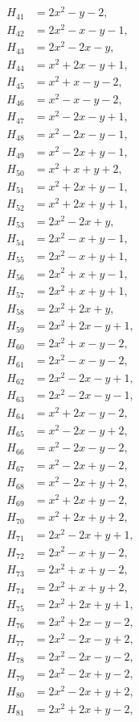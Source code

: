 \documentclass[11pt]{article}
\begin{document}
\begin{align*}
H_{41}&=2x^{2}-y-2,\\
H_{42}&=2x^{2}-x-y-1,\\
H_{43}&=2x^{2}-2x-y,\\
H_{44}&=x^{2}+2x-y+1,\\
H_{45}&=x^{2}+x-y-2,\\
H_{46}&=x^{2}-x-y-2,\\
H_{47}&=x^{2}-2x-y+1,\\
H_{48}&=x^{2}-2x-y-1,\\
H_{49}&=x^{2}-2x+y-1,\\
H_{50}&=x^{2}+x+y+2,\\
H_{51}&=x^{2}+2x+y-1,\\
H_{52}&=x^{2}+2x+y+1,\\
H_{53}&=2x^{2}-2x+y,\\
H_{54}&=2x^{2}-x+y-1,\\
H_{55}&=2x^{2}-x+y+1,\\
H_{56}&=2x^{2}+x+y-1,\\
H_{57}&=2x^{2}+x+y+1,\\
H_{58}&=2x^{2}+2x+y,\\
H_{59}&=2x^{2}+2x-y+1,\\
H_{60}&=2x^{2}+x-y-2,\\
H_{61}&=2x^{2}-x-y-2,\\
H_{62}&=2x^{2}-2x-y+1,\\
H_{63}&=2x^{2}-2x-y-1,\\
H_{64}&=x^{2}+2x-y-2,\\
H_{65}&=x^{2}-2x-y+2,\\
H_{66}&=x^{2}-2x-y-2,\\
H_{67}&=x^{2}-2x+y-2,\\
H_{68}&=x^{2}-2x+y+2,\\
H_{69}&=x^{2}+2x+y-2,\\
H_{70}&=x^{2}+2x+y+2,\\
H_{71}&=2x^{2}-2x+y+1,\\
H_{72}&=2x^{2}-x+y-2,\\
H_{73}&=2x^{2}+x+y-2,\\
H_{74}&=2x^{2}+x+y+2,\\
H_{75}&=2x^{2}+2x+y+1,\\
H_{76}&=2x^{2}+2x-y-2,\\
H_{77}&=2x^{2}-2x-y+2,\\
H_{78}&=2x^{2}-2x-y-2,\\
H_{79}&=2x^{2}-2x+y-2,\\
H_{80}&=2x^{2}-2x+y+2,\\
H_{81}&=2x^{2}+2x+y-2,\\

\end{align*}
\end{document}
